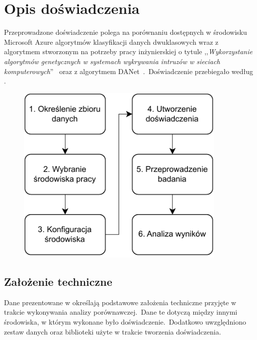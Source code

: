 \chapter{Opis doświadczenia}
\label{cha:dos}
Przeprowadzone doświadczenie polega na porównaniu dostępnych w środowisku Microsoft Azure algorytmów klasyfikacji danych dwuklasowych wraz z algorytmem stworzonym na potrzeby pracy inżynierskiej o tytule ,,\textit{Wykorzystanie algorytmów genetycznych w systemach wykrywania intruzów w sieciach komputerowych}''~\cite{Blyszcz2022} oraz z algorytmem DANet~\cite{Chen2022}.\ Doświadczenie przebiegało według .

\begin{figure}[H]
    \centering
    \includegraphics[width=0.9\textwidth]{images/schemat_pracy}
    \label{fig:sch-prac}
\end{figure}

\vfill
\pagebreak

\section{Założenie techniczne}

Dane prezentowane w  określają podstawowe założenia techniczne przyjęte w trakcie wykonywania analizy porównawczej.\ Dane te dotyczą między innymi środowiska, w którym wykonane było doświadczenie.\ Dodatkowo uwzględniono zestaw danych oraz biblioteki użyte w trakcie tworzenia doświadczenia.

